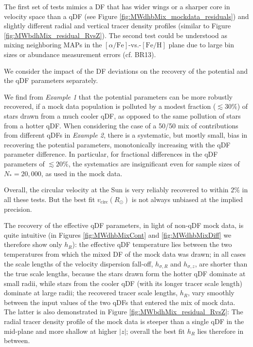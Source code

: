 \documentclass[iop,revtex4,numberedappendix,appendixfloats]{emulateapj}
\newcommand{\MAPs}{MAPs}
\begin{document}
The first set of tests mimics a DF that has wider wings or a sharper core in velocity space than a qDF (see Figure \ref{fig:MWdhbMix_mockdata_residuals}) and slightly different radial and vertical tracer density profiles (similar to Figure \ref{fig:MWbdhMix_residual_RvsZ}). The second test could be understood as mixing neighboring \MAPs{} in the $[\alpha/\mathrm{Fe}]$-vs.-$[\mathrm{Fe}/\mathrm{H}]$ plane due to large bin sizes or abundance measurement errors (cf. BR13). 

We consider the impact of the DF deviations on the recovery of the potential and the qDF parameters separately. 

We find from \emph{Example 1} that the potential parameters can be more robustly recovered, if a mock data population is polluted by a modest fraction ($\lesssim 30\%$) of stars drawn from a much cooler qDF, as opposed to the same pollution of stars from a hotter qDF. When considering the case of a 50/50 mix of contributions from different qDFs in \emph{Example 2}, there is a systematic, but mostly small, bias in recovering the potential parameters, monotonically increasing with the qDF parameter difference. In particular, for fractional differences in the qDF parameters of $\lesssim 20\%$, the systematics are insignificant even for sample sizes of $N_{*} = 20,000$, as used in the mock data.

Overall, the circular velocity at the Sun is very reliably recovered to within $2\%$ in all these tests. But the best fit $v_\text{circ}(R_\odot)$ is not always unbiased at the implied precision.

The recovery of the effective qDF parameters, in light of non-qDF mock data, is quite intuitive (in Figures \ref{fig:MWdhbMixCont} and \ref{fig:MWdhbMixDiff} we therefore show only $h_R$): the effective qDF temperature lies between the two temperatures from which the mixed DF of the mock data was drawn; in all cases the scale lengths of the velocity dispersion fall-off, $h_{\sigma,R}$ and $h_{\sigma,z}$, are shorter than the true scale lengths, because the stars drawn form the hotter qDF dominate at small radii, while stars from the cooler qDF (with its longer tracer scale length) dominate at large radii; the recovered tracer scale lengths, $h_R$, vary smoothly between the input values of the two qDFs that entered the mix of mock data. The latter is also demonstrated in Figure \ref{fig:MWbdhMix_residual_RvsZ}: The radial tracer density profile of the mock data is steeper than a single qDF in the mid-plane and more shallow at higher $|z|$; overall the best fit $h_R$ lies therefore in between.
\end{document}
